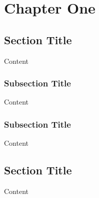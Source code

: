 
\chapter{Chapter One} %

\label{ch:first} %

\lipsum
\lipsum


\section{Section Title}

Content


\subsection{Subsection Title}

Content


\subsection{Subsection Title}

Content


\section{Section Title}

Content

